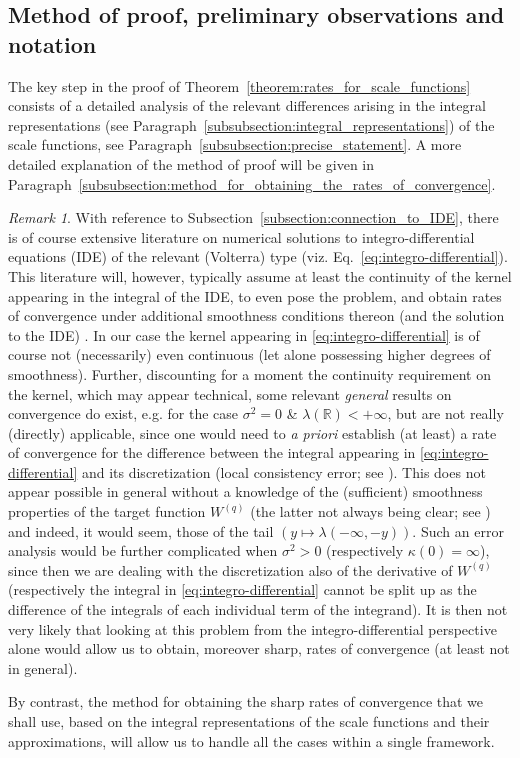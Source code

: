 \documentclass[pdftex,oneside,11pt,reqno]{amsart}
\theoremstyle{definition}
\theoremstyle{theorem}
\theoremstyle{remark}
\newtheorem{remark}{Remark}[section]
\numberwithin{equation}{section}
\numberwithin{definition}{section}
\begin{document}
\subsection{Method of proof, preliminary observations and notation}\label{subsection:method_preliminary_etc}
The key step in the proof of Theorem~\ref{theorem:rates_for_scale_functions}
consists of a detailed analysis of the relevant differences arising in the
integral representations (see
Paragraph~\ref{subsubsection:integral_representations}) of the scale functions,
see Paragraph~\ref{subsubsection:precise_statement}.
A more detailed explanation of the method of proof
will be given in 
Paragraph~\ref{subsubsection:method_for_obtaining_the_rates_of_convergence}.

\begin{remark}
With reference to Subsection~\ref{subsection:connection_to_IDE}, there is of course extensive literature on numerical solutions to integro-differential equations (IDE) of the relevant (Volterra) type (viz. Eq.~\eqref{eq:integro-differential}). This literature will, however, typically assume at least the continuity of the kernel appearing in the integral of the IDE, to even pose the problem, and obtain rates of convergence under additional smoothness conditions thereon (and the solution to the IDE) \cite[Chapters~2 and~3]{brunner} \cite[Chapters~7 and~11]{linz}. In our case the kernel appearing in \eqref{eq:integro-differential} is of course not (necessarily) even continuous (let alone possessing higher degrees of smoothness). Further, discounting for a moment the continuity requirement on the kernel, which may appear technical, some relevant \emph{general} results on convergence do exist, e.g. \cite[p. 102, Theorem 7.2]{linz} for the case ${\sigma^2}=0$ \& ${\lambda}(\mathbb{R})<+\infty$, but are not really (directly) applicable, since one would need to \emph{a priori} establish (at least) a rate of convergence for the difference between the integral appearing in \eqref{eq:integro-differential} and its discretization (local consistency error; see \cite[p. 101, Eq.~(7.12)]{linz}). This does not appear possible in general without a knowledge of the (sufficient) smoothness properties of the target function ${W^{(q)}}$ (the latter not always being clear; see \cite{kyprianou:smoothness}) and indeed, it would seem, those of the tail $(y \mapsto {\lambda}(-\infty,-y))$. Such an error analysis would be further complicated when ${\sigma^2}>0$ (respectively $\kappa(0)=\infty$), since then we are dealing with the discretization also of the derivative of ${W^{(q)}}$ (respectively the integral in \eqref{eq:integro-differential} cannot be split up as the difference of the integrals of each individual term of the integrand). It is then not very likely that looking at this problem from the integro-differential perspective alone would allow us to obtain, moreover sharp, rates of convergence (at least not in general). 

By contrast, the method for obtaining the sharp rates of convergence that we shall use, based on the integral representations of the scale functions and their approximations, will allow us to handle all the cases within a single framework.
\end{remark}
\end{document}
